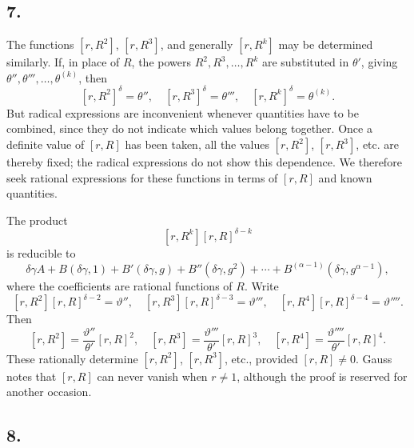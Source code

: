 \documentclass[12pt]{article}
\begin{document}
\subsection*{7.}

The functions $[r,R^2]$, $[r,R^3]$, and generally $[r,R^k]$ may be determined similarly. If, in place of $R$, the powers $R^2,R^3,\ldots,R^k$ are substituted in $\theta'$, giving $\theta'',\theta''',\ldots,\theta^{(k)}$, then
\[
[r,R^2]^\delta=\theta'',\quad [r,R^3]^\delta=\theta''',\quad
[r,R^k]^\delta=\theta^{(k)}.
\]
But radical expressions are inconvenient whenever quantities have to be combined, since they do not indicate which values belong together. Once a definite value of $[r,R]$ has been taken, all the values $[r,R^2]$, $[r,R^3]$, etc. are thereby fixed; the radical expressions do not show this dependence. We therefore seek rational expressions for these functions in terms of $[r,R]$ and known quantities.

The product
\[
[r,R^k][r,R]^{\delta-k}
\]
is reducible to
\[
\delta\gamma A+B(\delta\gamma,1)+B'(\delta\gamma,g)+B''(\delta\gamma,g^2)+\cdots+
B^{(\alpha-1)}(\delta\gamma,g^{\alpha-1}),
\]
where the coefficients are rational functions of $R$. Write
\[
[r,R^2][r,R]^{\delta-2}=\vartheta'',\quad
[r,R^3][r,R]^{\delta-3}=\vartheta''',\quad
[r,R^4][r,R]^{\delta-4}=\vartheta''''.
\]
Then
\[
[r,R^2]=\frac{\vartheta''}{\theta'}[r,R]^2,\quad
[r,R^3]=\frac{\vartheta'''}{\theta'}[r,R]^3,\quad
[r,R^4]=\frac{\vartheta''''}{\theta'}[r,R]^4.
\]
These rationally determine $[r,R^2]$, $[r,R^3]$, etc., provided $[r,R]\neq0$. Gauss notes that $[r,R]$ can never vanish when $r\neq1$, although the proof is reserved for another occasion.

\subsection*{8.}
\end{document}
